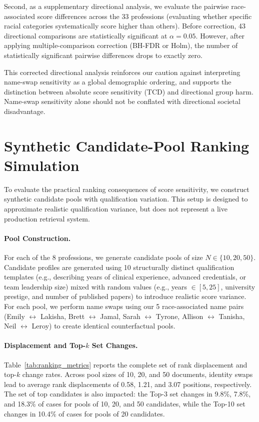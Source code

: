 \documentclass[11pt]{article}
\begin{document}
Second, as a supplementary directional analysis, we evaluate the pairwise race-associated score differences across the 33 professions (evaluating whether specific racial categories systematically score higher than others). Before correction, 43 directional comparisons are statistically significant at $\alpha = 0.05$. However, after applying multiple-comparison correction (BH-FDR or Holm), the number of statistically significant pairwise differences drops to exactly zero.

This corrected directional analysis reinforces our caution against interpreting name-swap sensitivity as a global demographic ordering, and supports the distinction between absolute score sensitivity (TCD) and directional group harm. Name-swap sensitivity alone should not be conflated with directional societal disadvantage.

\section{Synthetic Candidate-Pool Ranking Simulation}
\label{app:ranking_sim}

To evaluate the practical ranking consequences of score sensitivity, we construct synthetic candidate pools with qualification variation. This setup is designed to approximate realistic qualification variance, but does not represent a live production retrieval system.

\paragraph{Pool Construction.} For each of the 8 professions, we generate candidate pools of size $N \in \{10, 20, 50\}$. Candidate profiles are generated using 10 structurally distinct qualification templates (e.g., describing years of clinical experience, advanced credentials, or team leadership size) mixed with random values (e.g., years $\in [5, 25]$, university prestige, and number of published papers) to introduce realistic score variance. For each pool, we perform name swaps using our 5 race-associated name pairs (Emily $\leftrightarrow$ Lakisha, Brett $\leftrightarrow$ Jamal, Sarah $\leftrightarrow$ Tyrone, Allison $\leftrightarrow$ Tanisha, Neil $\leftrightarrow$ Leroy) to create identical counterfactual pools.

\paragraph{Displacement and Top-$k$ Set Changes.} Table~\ref{tab:ranking_metrics} reports the complete set of rank displacement and top-$k$ change rates. Across pool sizes of 10, 20, and 50 documents, identity swaps lead to average rank displacements of 0.58, 1.21, and 3.07 positions, respectively. The set of top candidates is also impacted: the Top-3 set changes in 9.8\%, 7.8\%, and 18.3\% of cases for pools of 10, 20, and 50 candidates, while the Top-10 set changes in 10.4\% of cases for pools of 20 candidates.
\end{document}

